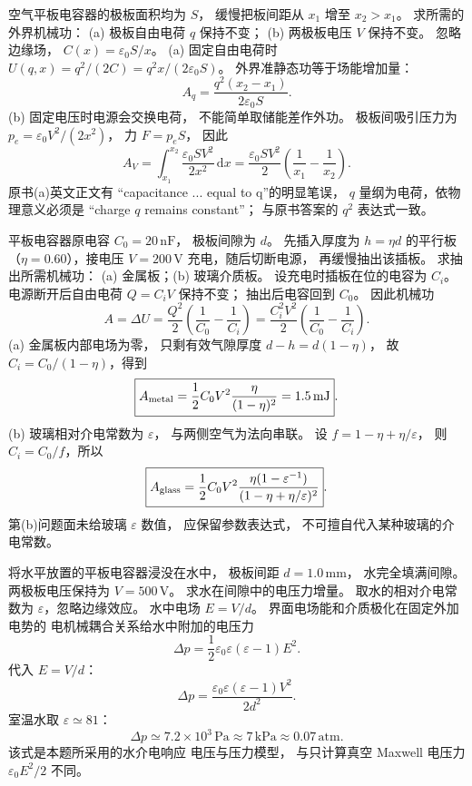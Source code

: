 空气平板电容器的极板面积均为 $S$，
缓慢把板间距从 $x_1$ 增至 $x_2>x_1$。
求所需的外界机械功：
(a) 极板自由电荷 $q$ 保持不变；
(b) 两极板电压 $V$ 保持不变。
\exsolution
忽略边缘场，
$C(x)=\varepsilon_0S/x$。
(a) 固定自由电荷时
$U(q,x)=q^2/(2C)=q^2x/(2\varepsilon_0S)$。
外界准静态功等于场能增加量：
\[
\boxed{A_q=\frac{q^2(x_2-x_1)}{2\varepsilon_0S}}.
\]
(b) 固定电压时电源会交换电荷，
不能简单取储能差作外功。
极板间吸引压力为
$p_e=\varepsilon_0V^2/(2x^2)$，
力 $F=p_eS$，
因此
\[
A_V=\int_{x_1}^{x_2}\frac{\varepsilon_0SV^2}{2x^2}
\,\mathrm dx
=\boxed{\frac{\varepsilon_0SV^2}{2}
\left(\frac1{x_1}-\frac1{x_2}\right)}.
\]
\excheck 原书(a)英文正文有
“capacitance ... equal to q”的明显笔误，
$q$ 量纲为电荷，依物理意义必须是
“charge $q$ remains constant”；
与原书答案的 $q^2$ 表达式一致。

平板电容器原电容 $C_0=20\,\mathrm{nF}$，
极板间隙为 $d$。
先插入厚度为 $h=\eta d$ 的平行板
（$\eta=0.60$），接电压
$V=200\,\mathrm V$ 充电，随后切断电源，
再缓慢抽出该插板。
求抽出所需机械功：
(a) 金属板；(b) 玻璃介质板。
\exsolution
设充电时插板在位的电容为 $C_i$。
电源断开后自由电荷
$Q=C_iV$ 保持不变；
抽出后电容回到 $C_0$。
因此机械功
\[
A=\Delta U=
\frac{Q^2}{2}\left(\frac1{C_0}-\frac1{C_i}\right)
=\frac{C_i^2V^2}{2}
\left(\frac1{C_0}-\frac1{C_i}\right).
\]
(a) 金属板内部电场为零，
只剩有效气隙厚度
$d-h=d(1-\eta)$，
故 $C_i=C_0/(1-\eta)$，得到
\[
\boxed{A_{\rm metal}=
\frac12C_0V^2\frac{\eta}{(1-\eta)^2}
=1.5\,\mathrm{mJ}}.
\]
(b) 玻璃相对介电常数为 $\varepsilon$，
与两侧空气为法向串联。
设
$f=1-\eta+\eta/\varepsilon$，
则 $C_i=C_0/f$，所以
\[
\boxed{A_{\rm glass}=
\frac12C_0V^2
\frac{\eta(1-\varepsilon^{-1})}
{(1-\eta+\eta/\varepsilon)^2}}.
\]
\excheck 第(b)问题面未给玻璃 $\varepsilon$ 数值，
应保留参数表达式，
不可擅自代入某种玻璃的介电常数。

将水平放置的平板电容器浸没在水中，
极板间距 $d=1.0\,\mathrm{mm}$，
水完全填满间隙。
两极板电压保持为 $V=500\,\mathrm V$。
求水在间隙中的电压力增量。
\exsolution
取水的相对介电常数为
$\varepsilon$，忽略边缘效应。
水中电场 $E=V/d$。
界面电场能和介质极化在固定外加电势的
电机械耦合关系给水中附加的电压力
\[
\Delta p=\frac12\varepsilon_0
\varepsilon(\varepsilon-1)E^2.
\]
代入 $E=V/d$：
\[
\boxed{\Delta p=
\frac{\varepsilon_0\varepsilon(\varepsilon-1)V^2}{2d^2}}.
\]
室温水取 $\varepsilon\simeq81$：
\[
\boxed{\Delta p\simeq7.2\times10^3\,\mathrm{Pa}
\approx7\,\mathrm{kPa}\approx0.07\,\mathrm{atm}}.
\]
\excheck 该式是本题所采用的水介电响应
电压与压力模型，
与只计算真空 Maxwell 电压力
$\varepsilon_0E^2/2$ 不同。

